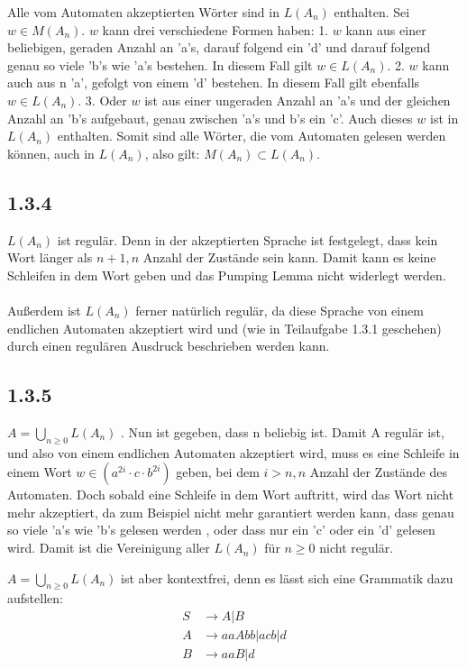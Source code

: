 \documentclass{article}
\begin{document}
Alle vom Automaten akzeptierten Wörter sind in $L(A_n)$ enthalten.
Sei $w \in M(A_n)$. $w$ kann drei verschiedene Formen haben: 1. $w$ kann aus einer beliebigen, geraden Anzahl an
'a's, darauf folgend ein 'd' und darauf folgend genau so viele 'b's
wie 'a's bestehen. In diesem Fall gilt $w \in L(A_n)$. 2. $w$ kann auch aus n 'a', gefolgt von einem 'd' bestehen. In diesem Fall gilt ebenfalls $w \in L(A_n)$. 3. Oder
$w$ ist aus einer ungeraden Anzahl an 'a's und der gleichen Anzahl
an 'b's aufgebaut, genau zwischen 'a's und b's ein 'c'. Auch dieses
$w$ ist in $L(A_n)$ enthalten. Somit sind alle Wörter, die vom
Automaten gelesen werden können, auch in $L(A_n)$, also gilt:
$M(A_n) \subset L(A_n)$. 

\subsection*{1.3.4}

$L(A_n)$ ist regulär. Denn in der akzeptierten Sprache ist
festgelegt, dass kein Wort länger als $n + 1, n$ Anzahl der Zustände
sein kann. Damit kann es keine Schleifen in dem Wort geben und das
Pumping Lemma nicht widerlegt werden.
\\ \\
Außerdem ist $L(A_n)$ ferner natürlich regulär, da diese Sprache von
einem endlichen Automaten akzeptiert wird und (wie in Teilaufgabe 1.3.1
geschehen) durch einen regulären Ausdruck beschrieben werden kann.

\subsection*{1.3.5}
 
 $A = \bigcup_{n \geq 0} L(A_n)$ . Nun ist gegeben, dass n beliebig
ist. Damit A regulär ist, und also von einem endlichen Automaten
akzeptiert wird, muss es eine Schleife in einem Wort $w \in
(a^{2i}\cdot c\cdot b^{2i})$ geben, bei dem $i > n, n$ Anzahl der
Zustände des Automaten. Doch sobald eine Schleife in dem Wort auftritt, 
wird das Wort nicht mehr akzeptiert, da zum Beispiel nicht mehr garantiert werden kann, dass genau so viele 'a's wie 'b's gelesen werden , oder dass nur ein 'c' oder ein 'd' gelesen wird. Damit ist die Vereinigung aller $L(A_n)$ für $n \geq 0$ nicht regulär. 

 $A = \bigcup_{n \geq 0} L(A_n)$ ist aber kontextfrei, denn es lässt sich eine Grammatik dazu aufstellen:
\begin{align*}
 S &\rightarrow A | B \\
 A &\rightarrow aaAbb | acb | d \\
 B &\rightarrow aaB | d 
\end{align*}
 
\end{document}
